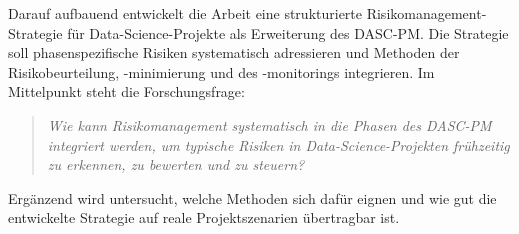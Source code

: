 Darauf aufbauend entwickelt die Arbeit eine strukturierte Risikomanagement-Strategie für Data-Science-Projekte als Erweiterung des DASC-PM.
Die Strategie soll phasenspezifische Risiken systematisch adressieren und Methoden der Risikobeurteilung, -minimierung und des -monitorings integrieren.
Im Mittelpunkt steht die Forschungsfrage:

\begin{quote}
\textit{Wie kann Risikomanagement systematisch in die Phasen des DASC-PM integriert werden, um typische Risiken in Data-Science-Projekten frühzeitig zu erkennen, zu bewerten und zu steuern?}
\end{quote}

Ergänzend wird untersucht, welche Methoden sich dafür eignen und wie gut die entwickelte Strategie auf reale Projektszenarien übertragbar ist.
